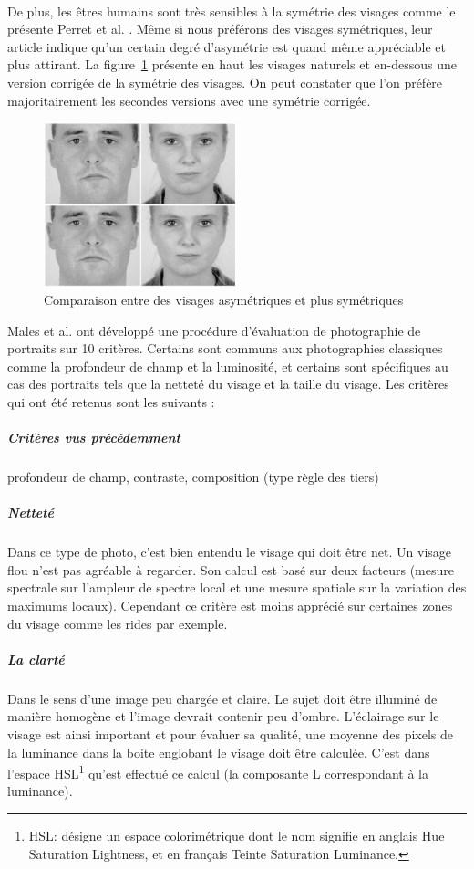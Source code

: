 \documentclass[11pt, french]{report-rd-info}
\begin{document}
\paragraph*{}
De plus, les êtres humains sont très sensibles à la symétrie des visages comme le présente Perret et al. \cite{Perrett1999}. Même si nous préférons des visages symétriques, leur article indique qu'un certain degré d'asymétrie est quand même appréciable et plus attirant. La figure~\ref{fig:VisagesSymetriques} présente en haut les visages naturels et en-dessous une version corrigée de la symétrie des visages. On peut constater que l'on préfère majoritairement les secondes versions avec une symétrie corrigée.
\begin{figure}
	\centering
	\includegraphics[width=0.5\textwidth]{Images/ea_visages_symetriques}
	\caption{Comparaison entre des visages asymétriques et plus symétriques \cite{Perrett1999}}
	\label{fig:VisagesSymetriques}
\end{figure}
Males et al. \cite{Males2013} ont développé une procédure d'évaluation de photographie de portraits sur 10 critères. Certains sont communs aux photographies classiques comme la profondeur de champ et la luminosité, et certains sont spécifiques au cas des portraits tels que la netteté du visage et la taille du visage. Les critères qui ont été retenus sont les suivants :
\subparagraph{Critères vus précédemment} profondeur de champ, contraste, composition (type règle des tiers)
\subparagraph{Netteté} Dans ce type de photo, c'est bien entendu le visage qui doit être net. Un visage flou n'est pas agréable à regarder. Son calcul est basé sur deux facteurs (mesure spectrale sur l’ampleur de spectre local et une mesure spatiale sur la variation des maximums locaux). Cependant ce critère est moins apprécié sur certaines zones du visage comme les rides par exemple.
\subparagraph{La clarté} Dans le sens d'une image peu chargée et claire. Le sujet doit être illuminé de manière homogène et l’image devrait contenir peu d’ombre. L’éclairage sur le visage est ainsi important et pour évaluer sa qualité, une moyenne des pixels de la luminance dans la boite englobant le visage doit être calculée. C’est dans l’espace HSL\footnote{HSL: désigne un espace colorimétrique dont le nom signifie en anglais Hue Saturation Lightness, et en français Teinte Saturation Luminance.} qu’est effectué ce calcul (la composante L correspondant à la luminance).
\end{document}
